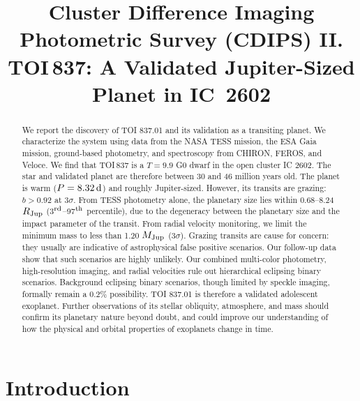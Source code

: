 \documentclass[12pt,twocolumn,tighten]{aastex63}
\begin{document}

\title{
  Cluster Difference Imaging Photometric Survey (CDIPS) II.
  TOI$\,$837: A Validated Jupiter-Sized Planet in IC~2602
}

\suppressAffiliations


\begin{abstract}
  We report the discovery of TOI 837.01 and its validation as a
  transiting planet.  We characterize the system using data from the
  NASA TESS mission, the ESA Gaia mission, ground-based photometry,
  and spectroscopy from CHIRON, FEROS, and Veloce.  We find that
  TOI$\,$837 is a $T=9.9$ G0 dwarf in the open cluster IC 2602.  The
  star and validated planet are therefore between 30 and 46 million
  years old.  The planet is warm ($P = 8.32\,{\rm d}$) and roughly
  Jupiter-sized.  However, its transits are grazing: $b > 0.92$ at
  3$\sigma$.  From TESS photometry alone, the planetary size lies
  within 0.68--8.24 $R_{\rm Jup}$ (3$^{\rm rd}$--97$^{\rm th}$
  percentile), due to the degeneracy between the planetary size and
  the impact parameter of the transit.  From radial velocity
  monitoring, we limit the minimum mass to less than 1.20 $M_{\rm
  Jup}$ (3$\sigma$).  Grazing transits are cause for concern: they
  usually are indicative of astrophysical false positive scenarios.
  Our follow-up data show that such scenarios are highly unlikely.
  Our combined multi-color photometry, high-resolution imaging, and
  radial velocities rule out hierarchical eclipsing binary scenarios.
  Background eclipsing binary scenarios, though limited by speckle
  imaging, formally remain a 0.2\% possibility.  TOI 837.01 is
  therefore a validated adolescent exoplanet.  Further observations of
  its stellar obliquity, atmosphere, and mass should confirm its
  planetary nature beyond doubt, and could improve our understanding
  of how the physical and orbital properties of exoplanets change in
  time.
\end{abstract}




\section{Introduction}
\end{document}
